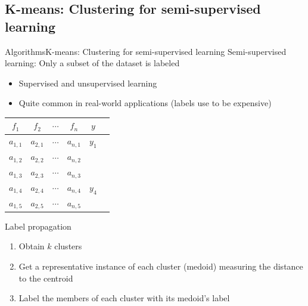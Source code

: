 \documentclass[10pt,compress]{beamer} %
\begin{document}
\subsection{K-means: Clustering for semi-supervised learning}
\begin{frame}[plain]{Algorithms}{K-means: Clustering for semi-supervised learning}
    Semi-supervised learning: Only a subset of the dataset is labeled
    \begin{itemize}
       \item Supervised and unsupervised learning
       \item Quite common in real-world applications (labels use to be expensive)
    \end{itemize} 

	\begin{center}
	\begin{tabular}{cccccc}\hline
	 	$f_1$     & $f_2$     & $\cdots$ & $f_n$     & $y$\\\hline
	 	$a_{1,1}$ & $a_{2,1}$ & $\cdots$ & $a_{n,1}$ & $y_1$ \\
	 	$a_{1,2}$ & $a_{2,2}$ & $\cdots$ & $a_{n,2}$ &  \\
	 	$a_{1,3}$ & $a_{2,3}$ & $\cdots$ & $a_{n,3}$ &  \\
	 	$a_{1,4}$ & $a_{2,4}$ & $\cdots$ & $a_{n,4}$ & $y_4$ \\
	 	$a_{1,5}$ & $a_{2,5}$ & $\cdots$ & $a_{n,5}$ &  \\
	 	\hline
	\end{tabular}
	\end{center}

    \begin{block}{Label propagation}
    \begin{enumerate}
       \item Obtain $k$ clusters
       \item Get a representative instance of each cluster (\alert{medoid}) measuring the distance to the centroid
       \item Label the members of each cluster with its medoid's label
    \end{enumerate} 
    \end{block}
\end{frame}
\end{document}
